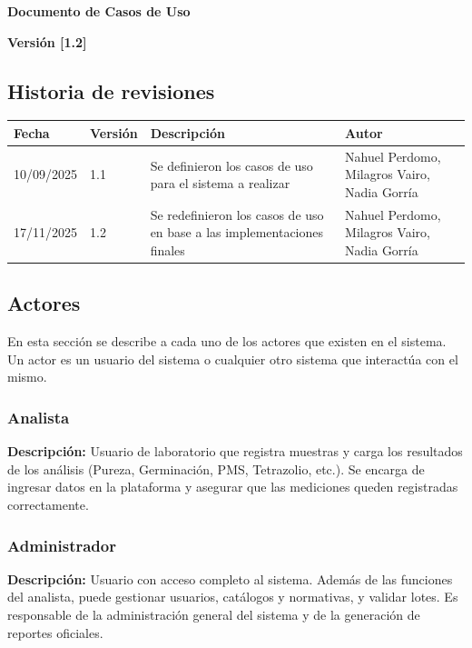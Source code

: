 
{\Large\bfseries Documento de Casos de Uso}

\vspace{1em}
\textbf{Versión [1.2]}

\vspace{2em}
\begingroup\let\clearpage\relax
\subsection{Historia de revisiones}
\endgroup

\begin{table}[h]
\centering
\begin{tabular}{|p{3cm}|p{2cm}|p{6cm}|p{3cm}|}
\hline
\textbf{Fecha} & \textbf{Versión} & \textbf{Descripción} & \textbf{Autor} \\
\hline
10/09/2025 & 1.1 & Se definieron los casos de uso para el sistema a realizar & Nahuel Perdomo, Milagros Vairo, Nadia Gorría \\
\hline
17/11/2025 & 1.2 & Se redefinieron los casos de uso en base a las implementaciones finales & Nahuel Perdomo, Milagros Vairo, Nadia Gorría \\
\hline
\end{tabular}
\end{table}

\clearpage

\subsection{Actores}
En esta sección se describe a cada uno de los actores que existen en el sistema. Un actor es un usuario del sistema o cualquier otro sistema que interactúa con el mismo.

\subsubsection{Analista}
\textbf{Descripción:} Usuario de laboratorio que registra muestras y carga los resultados de los análisis (Pureza, Germinación, PMS, Tetrazolio, etc.). Se encarga de ingresar datos en la plataforma y asegurar que las mediciones queden registradas correctamente.

\subsubsection{Administrador}
\textbf{Descripción:} Usuario con acceso completo al sistema. Además de las funciones del analista, puede gestionar usuarios, catálogos y normativas, y validar lotes. Es responsable de la administración general del sistema y de la generación de reportes oficiales.

